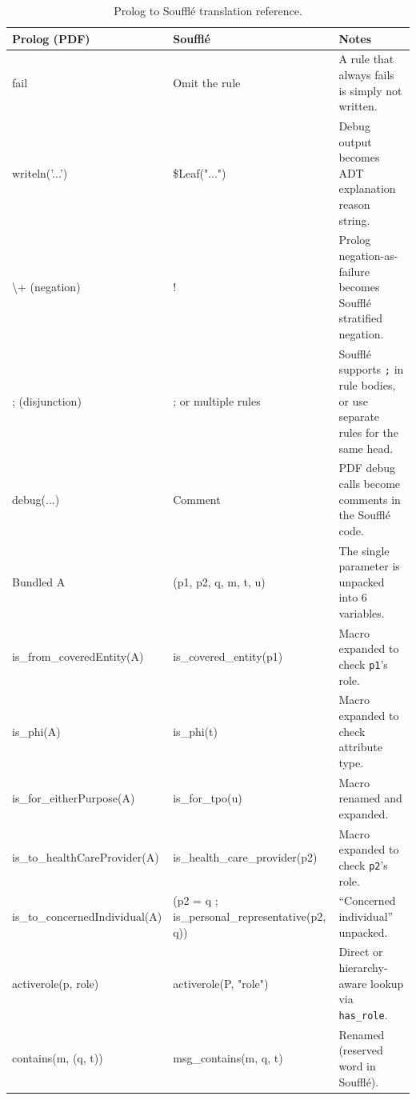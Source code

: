 \documentclass[11pt,letterpaper]{article}
\begin{document}
\begin{table}[H]
\centering
\footnotesize
\begin{tabularx}{\textwidth}{>{\raggedright\scriptsize\ttfamily\hyphenpenalty=50\exhyphenpenalty=50}p{3.0cm} >{\raggedright\scriptsize\ttfamily\hyphenpenalty=50\exhyphenpenalty=50}p{3.8cm} >{\raggedright\arraybackslash\footnotesize}X}
\toprule
\textrm{\textbf{Prolog (PDF)}} & \textrm{\textbf{Souffl\'{e}}} & \textbf{Notes} \\
\midrule
fail & \textrm{Omit the rule} & A rule that always fails is simply not written. \\[3pt]
writeln('...') & \$Leaf("...") & Debug output becomes ADT explanation reason string. \\[3pt]
\textbackslash+ \textrm{(negation)} & ! & Prolog negation-as-failure becomes Souffl\'{e} stratified negation. \\[3pt]
; \textrm{(disjunction)} & ; \textrm{or multiple rules} & Souffl\'{e} supports \texttt{;} in rule bodies, or use separate rules for the same head. \\[3pt]
debug(...) & \textrm{Comment} & PDF debug calls become comments in the Souffl\'{e} code. \\[3pt]
\textrm{Bundled} A & (p1, p2, q, m, t, u) & The single parameter is unpacked into 6 variables. \\[3pt]
is\_from\_\allowbreak coveredEntity(A) & is\_covered\_\allowbreak entity(p1) & Macro expanded to check \texttt{p1}'s role. \\[3pt]
is\_phi(A) & is\_phi(t) & Macro expanded to check attribute type. \\[3pt]
is\_for\_either\-Purpose(A) & is\_for\_tpo(u) & Macro renamed and expanded. \\[3pt]
is\_to\_health\-CareProvider(A) & is\_health\_care\_\allowbreak provider(p2) & Macro expanded to check \texttt{p2}'s role. \\[3pt]
is\_to\_concerned\-Individual(A) & \textrm{(p2 = q ; is\_personal\_\allowbreak representative(p2, q))} & ``Concerned individual'' unpacked. \\[3pt]
activerole(p, role) & activerole(P, "role") & Direct or hierarchy-aware lookup via \texttt{has\_role}. \\[3pt]
contains(m, (q, t)) & msg\_contains(m, q, t) & Renamed (reserved word in Souffl\'{e}). \\
\bottomrule
\end{tabularx}
\caption{Prolog to Souffl\'{e} translation reference.}
\label{tab:prolog-translation}
\end{table}
\end{document}
